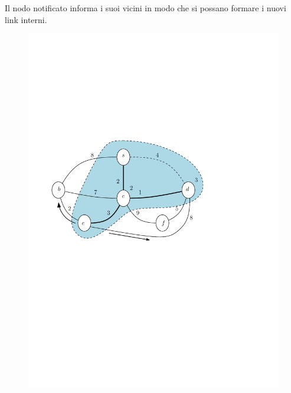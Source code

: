 \documentclass[10pt,xcolor=dvipsnames]{beamer}
\begin{document}
\begin{frame}
	\frametitle{}
		Il nodo notificato informa i suoi vicini in modo che si possano formare
		i nuovi link interni.
	\begin{figure}[h]
	\centering
		\includegraphics[scale=0.6]{PT5.pdf}
	\end{figure}
\end{frame}
\end{document}
